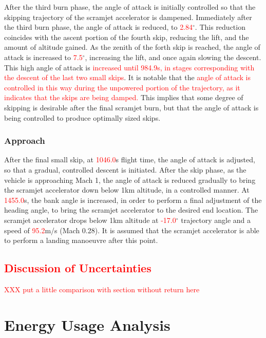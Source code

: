 After the third burn phase, the angle of attack is initially controlled so that the skipping trajectory of the scramjet accelerator is dampened.
Immediately after the third burn phase, the angle of attack is reduced, to \textcolor{red}{2.84}$^\circ$. This reduction coincides with the ascent portion of the fourth skip, reducing the lift, and the amount of altitude gained. 
As the zenith of the forth skip is reached, the angle of attack is increased to \textcolor{red}{7.5}$^\circ$, increasing the lift, and once again slowing the descent. 
This high angle of attack is \textcolor{red}{increased until 984.9s, in stages corresponding with the descent of the last two small skips}.
It is notable that the \textcolor{red}{angle of attack is controlled in this way during the unpowered portion of the trajectory, as it indicates that the skips are being damped.} This implies that some degree of skipping is desirable after the final scramjet burn, but that the angle of attack is being controlled to produce optimally sized skips. 

\subsubsection{Approach}

After the final small skip, at \textcolor{red}{1046.0}s flight time, the angle of attack is adjusted, so that a gradual, controlled descent is initiated. 
After the skip phase, as the vehicle is approaching Mach 1, the angle of attack is reduced gradually to bring the scramjet accelerator down below 1km altitude, in a controlled manner. At \textcolor{red}{1455.0}s, the bank angle is increased, in order to perform a final adjustment of the heading angle, to bring the scramjet accelerator to the desired end location. 
The scramjet accelerator drops below 1km altitude at \textcolor{red}{-17.0}$^\circ$ trajectory angle and a speed of \textcolor{red}{95.2}m/s (Mach 0.28). It is assumed that the scramjet accelerator is able to perform a landing manoeuvre after this point. 


\textcolor{red}{
	\section{Discussion of Uncertainties}
	}
\textcolor{red}{XXX put a little comparison with section without return here}

\section{Energy Usage Analysis}


